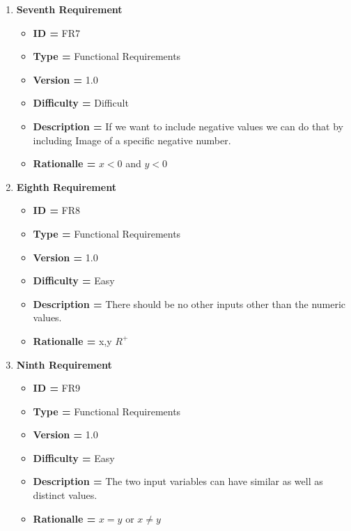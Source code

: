 \documentclass{article}
\begin{document}
\begin{enumerate}[noitemsep]
        \newpage
        \item \textbf{Seventh Requirement}
        \begin{itemize}
            \item \textbf{ID = } FR7
            \item\textbf{Type = } Functional Requirements
            \item\textbf{Version = } 1.0
            \item\textbf{Difficulty = } Difficult
            \item\textbf{Description = } If we want to include negative values we can do that by including Image of a specific negative number.
            \item\textbf{Rationalle = } $x<0$ and $y<0$
        \end{itemize}
        
        \newline
        \item \textbf{Eighth Requirement}
        \begin{itemize}
            \item \textbf{ID = } FR8
            \item\textbf{Type = } Functional Requirements
            \item\textbf{Version = } 1.0
            \item\textbf{Difficulty = } Easy
            \item\textbf{Description = } There should be no other inputs other than the numeric values.
            \item\textbf{Rationalle = } x,y \in $R^+$
        \end{itemize}
        
        \newline
        \item \textbf{Ninth Requirement}
        \begin{itemize}
            \item \textbf{ID = } FR9
            \item\textbf{Type = } Functional Requirements
            \item\textbf{Version = } 1.0
            \item\textbf{Difficulty = } Easy
            \item\textbf{Description = } The two input variables can have similar as well as distinct values.
            \item\textbf{Rationalle = } $x=y$ or $x\neq y$
        \end{itemize}
    \end{enumerate}
\end{document}
